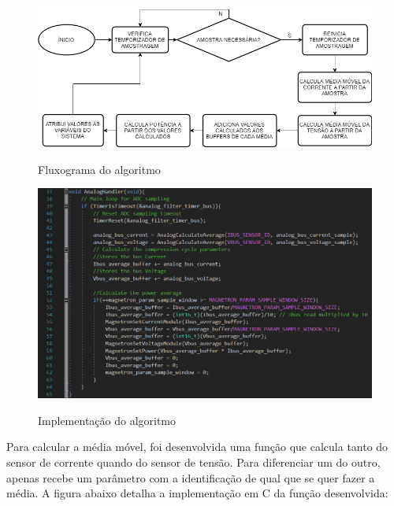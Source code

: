 \begin{figure}[H]
    \centering
    \caption{Fluxograma do algoritmo}
    \includegraphics[width=1\textwidth]{./dados/figuras/flow_ad}
    \label{fig:figura-func_analog}
\end{figure}


\begin{figure}[H]
    \centering
    \caption{Implementação do algoritmo}
    \includegraphics[width=1\textwidth]{./dados/figuras/func_analog}
    \label{fig:figura-func_analog}
\end{figure}



Para calcular a média móvel, foi desenvolvida uma função que calcula tanto do sensor de corrente quando do sensor de tensão. Para diferenciar um do outro, apenas recebe um parâmetro com a identificação de qual que se quer fazer a média. A figura abaixo detalha a implementação em C da função desenvolvida:

